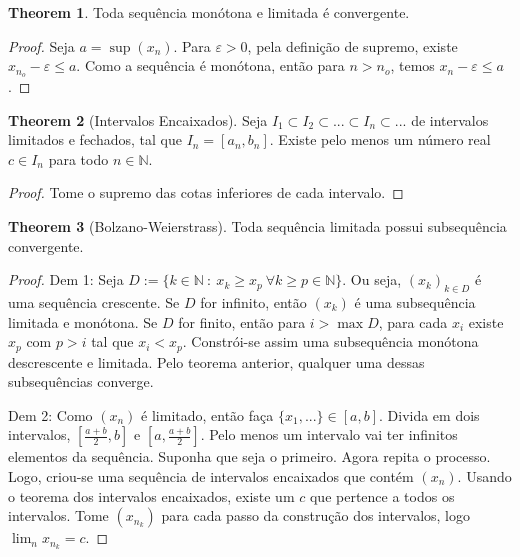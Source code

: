 \documentclass[10pt]{article}
\theoremstyle{definition}
\newtheorem{theorem}{Theorem}
\begin{document}
\begin{theorem}
	Toda sequência monótona e limitada é convergente.
\end{theorem}
\begin{proof}
	Seja $a = \sup (x_n)$. Para $\varepsilon > 0$, pela definição de supremo,
	existe $x_{n_o} - \varepsilon \leq a$. Como a sequência é monótona, então
	para $n>n_o$, temos $x_n - \varepsilon \leq a$.
\end{proof}
\begin{theorem}[Intervalos Encaixados]
	Seja $I_1 \subset I_2 \subset ... \subset I_n \subset ...$ de intervalos limitados e fechados,
	tal que $I_n = [a_n,b_n]$. Existe pelo menos um número real $c \in I_n$ para todo $n \in \mathbb N$.
\end{theorem}
\begin{proof}
	Tome o supremo das cotas inferiores de cada intervalo. 
\end{proof}


\begin{theorem}[Bolzano-Weierstrass]
	Toda sequência limitada possui subsequência convergente.
\end{theorem}
\begin{proof}
	Dem 1: Seja $D:=\{k \in \mathbb N \ : \ x_k \geq x_p \ \forall k \geq p \in \mathbb N \}$. Ou seja, $(x_k)_{k\in D}$ é
	uma sequência crescente. Se $D$ for infinito, então $(x_k)$ é uma subsequência limitada e monótona.
	Se $D$ for finito, então para $i > \max D$, para cada $x_i$ existe $x_p$ com $p > i$ tal que
	$x_i < x_p$. Constrói-se assim uma subsequência monótona descrescente e limitada. Pelo teorema anterior, qualquer
	uma dessas subsequências converge.

	Dem 2: Como $(x_n)$ é limitado, então faça $\{x_1,...\} \in [a,b]$. Divida em dois intervalos,
	$[\frac{a+b}{2},b]$ e $[a,\frac{a+b}{2}]$. Pelo menos um intervalo vai ter infinitos elementos da sequência.
	Suponha que seja o primeiro. Agora repita o processo. Logo, criou-se uma sequência de intervalos
	encaixados que contém $(x_n)$. Usando o teorema dos intervalos encaixados, existe um $c$ que pertence
	a todos os intervalos. Tome $(x_{n_k})$ para cada passo da construção dos intervalos, logo
	$\lim_n x_{n_k} = c$.
\end{proof}
\end{document}
